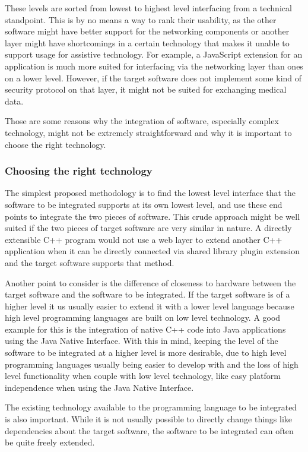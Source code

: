 \documentclass[BSA,Bachelor,english]{twbook}%
\begin{document}
These levels are sorted from lowest to highest level interfacing from a technical standpoint. This is by no means a way to rank their usability, as the other software might have better support for the networking components or another layer might have shortcomings in a certain technology that makes it unable to support usage for assistive technology. For example, a JavaScript extension for an application is much more suited for interfacing via the networking layer than ones on a lower level. However, if the target software does not implement some kind of security protocol on that layer, it might not be suited for exchanging medical data.

Those are some reasons why the integration of software, especially complex technology, might not be extremely straightforward and why it is important to choose the right technology.

\subsubsection{Choosing the right technology}

The simplest proposed methodology is to find the lowest level interface that the software to be integrated supports at its own lowest level, and use these end points to integrate the two pieces of software. This crude approach might be well suited if the two pieces of target software are very similar in nature. A directly extensible C++ program would not use a web layer to extend another C++ application when it can be directly connected via shared library plugin extension and the target software supports that method.

Another point to consider is the difference of closeness to hardware between the target software and the software to be integrated. If the target software is of a higher level it us usually easier to extend it with a lower level language because high level programming languages are built on low level technology. A good example for this is the integration of native C++ code into Java applications using the Java Native Interface. With this in mind, keeping the level of the software to be integrated at a higher level is more desirable, due to high level programming languages usually being easier to develop with and the loss of high level functionality when couple with low level technology, like easy platform independence when using the Java Native Interface.

The existing technology available to the programming language to be integrated is also important. While it is not usually possible to directly change things like dependencies about the target software, the software to be integrated can often be quite freely extended.
\end{document}
